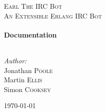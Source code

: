 \begin{titlepage}
\begin{center}

\textsc{\LARGE Earl The IRC Bot}\\[1.5cm]

\textsc{\Large An Extensible Erlang IRC Bot}\\[0.5cm]

\HRule \\[0.4cm]
{ \huge \bfseries Documentation \\[0.4cm] }
\HRule \\[1.5cm]

\noindent
\begin{minipage}{0.4\textwidth}
\begin{flushleft} \large
\emph{Author:}\\
Jonathan \textsc{Poole}\\
Martin \textsc{Ellis}\\
Simon \textsc{Cooksey}\\
\end{flushleft}
\end{minipage}%
\begin{minipage}{0.4\textwidth}

\end{minipage}

\vfill

{\large \today}

\end{center}
\end{titlepage}
